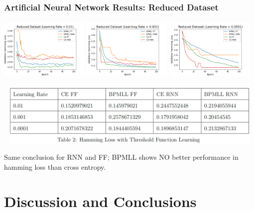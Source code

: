 \documentclass{beamer}
\begin{document}
\begin{frame}[t]
\frametitle{Artificial Neural Network Results: Reduced Dataset}
\begin{center}

\includegraphics[width=0.32\textwidth,height=3cm]{Images/Reduced_Dataset_Learning_Rate_01.png}
\includegraphics[width=0.32\textwidth,height=3cm]{Images/Reduced_Dataset_Learning_Rate_001.png}
\includegraphics[width=0.32\textwidth,height=3cm]{Images/Reduced_Dataset_Learning_Rate_0001.png}        
\end{center}

\begin{center}

\includegraphics[width=1\textwidth,height=3cm]{Images/Threshold learning for reduced dataset.png}
\end{center}

Same conclusion for RNN and FF; BPMLL shows NO
better performance in hamming loss than cross entropy.
\end{frame}

\section{Discussion and Conclusions}
\end{document}
